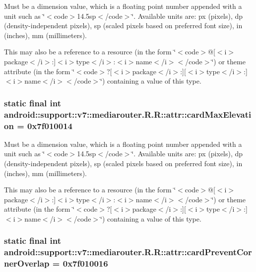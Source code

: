 Must be a dimension value, which is a floating point number appended with a unit such as \char`\"{}$<$code$>$14.5sp$<$/code$>$\char`\"{}. Available units are: px (pixels), dp (density-independent pixels), sp (scaled pixels based on preferred font size), in (inches), mm (millimeters). 

This may also be a reference to a resource (in the form \char`\"{}$<$code$>$@\mbox{[}$<$i$>$package$<$/i$>$:\mbox{]}$<$i$>$type$<$/i$>$:$<$i$>$name$<$/i$>$$<$/code$>$\char`\"{}) or theme attribute (in the form \char`\"{}$<$code$>$?\mbox{[}$<$i$>$package$<$/i$>$:\mbox{]}\mbox{[}$<$i$>$type$<$/i$>$:\mbox{]}$<$i$>$name$<$/i$>$$<$/code$>$\char`\"{}) containing a value of this type. \hypertarget{classandroid_1_1support_1_1v7_1_1mediarouter_1_1_r_1_1attr_ac896d3d6509139d310c3ee60ddb3de4}{
\subsubsection[{cardMaxElevation}]{\setlength{\rightskip}{0pt plus 5cm}static final int android::support::v7::mediarouter.R.R::attr::cardMaxElevation = 0x7f010014}}
\label{classandroid_1_1support_1_1v7_1_1mediarouter_1_1_r_1_1attr_ac896d3d6509139d310c3ee60ddb3de4}


Must be a dimension value, which is a floating point number appended with a unit such as \char`\"{}$<$code$>$14.5sp$<$/code$>$\char`\"{}. Available units are: px (pixels), dp (density-independent pixels), sp (scaled pixels based on preferred font size), in (inches), mm (millimeters). 

This may also be a reference to a resource (in the form \char`\"{}$<$code$>$@\mbox{[}$<$i$>$package$<$/i$>$:\mbox{]}$<$i$>$type$<$/i$>$:$<$i$>$name$<$/i$>$$<$/code$>$\char`\"{}) or theme attribute (in the form \char`\"{}$<$code$>$?\mbox{[}$<$i$>$package$<$/i$>$:\mbox{]}\mbox{[}$<$i$>$type$<$/i$>$:\mbox{]}$<$i$>$name$<$/i$>$$<$/code$>$\char`\"{}) containing a value of this type. \hypertarget{classandroid_1_1support_1_1v7_1_1mediarouter_1_1_r_1_1attr_5ee92a1e6d9f40994c1593a27fcbced5}{
\subsubsection[{cardPreventCornerOverlap}]{\setlength{\rightskip}{0pt plus 5cm}static final int android::support::v7::mediarouter.R.R::attr::cardPreventCornerOverlap = 0x7f010016}}
\label{classandroid_1_1support_1_1v7_1_1mediarouter_1_1_r_1_1attr_5ee92a1e6d9f40994c1593a27fcbced5}


